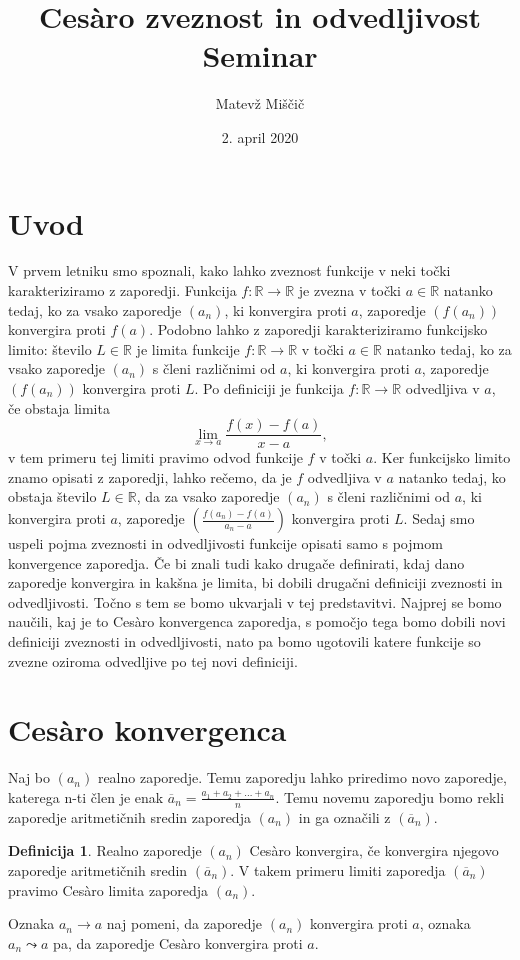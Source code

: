 \documentclass[a4paper,12pt]{article}
\title{Ces\`{a}ro zveznost in odvedljivost \\ Seminar}
\author{Matevž Miščič}
\date{2. april 2020}
\theoremstyle{definition}
\newtheorem{definicija}{Definicija}
\theoremstyle{plain}
\begin{document}
\maketitle{}

\section*{Uvod}
V prvem letniku smo spoznali, kako lahko zveznost funkcije v neki točki karakteriziramo z zaporedji. Funkcija $f: \mathbb{R} \rightarrow \mathbb{R}$ je zvezna v točki $a \in \mathbb{R}$ natanko tedaj, ko za vsako zaporedje $(a_n)$, ki konvergira proti $a$, zaporedje $(f(a_n))$ konvergira proti $f(a)$. Podobno lahko z zaporedji karakteriziramo funkcijsko limito: število $L \in \mathbb{R}$ je limita funkcije $f: \mathbb{R} \rightarrow \mathbb{R}$ v točki $a \in \mathbb{R}$ natanko tedaj, ko za vsako zaporedje $(a_n)$ s členi različnimi od $a$, ki konvergira proti $a$, zaporedje $(f(a_n))$ konvergira proti $L$. Po definiciji je funkcija $f: \mathbb{R} \rightarrow \mathbb{R}$ odvedljiva v $a$, če obstaja limita $$\lim_{x \rightarrow a} \frac{f(x)-f(a)}{x-a},$$ v tem primeru tej limiti pravimo odvod funkcije $f$ v točki $a$. Ker funkcijsko limito znamo opisati z zaporedji, lahko rečemo, da je $f$ odvedljiva v $a$ natanko tedaj, ko obstaja število $L \in \mathbb{R}$, da za vsako zaporedje $(a_n)$ s členi različnimi od $a$, ki konvergira proti $a$, zaporedje $(\frac{f(a_n)-f(a)}{a_n-a})$ konvergira proti $L$. Sedaj smo uspeli pojma zveznosti in odvedljivosti funkcije opisati samo s pojmom konvergence zaporedja. Če bi znali tudi kako drugače definirati, kdaj dano zaporedje konvergira in kakšna je limita, bi dobili drugačni definiciji zveznosti in odvedljivosti. Točno s tem se bomo ukvarjali v tej predstavitvi. Najprej se bomo naučili, kaj je to Ces\`{a}ro konvergenca zaporedja, s pomočjo tega bomo dobili novi definiciji zveznosti in odvedljivosti, nato pa bomo ugotovili katere funkcije so zvezne oziroma odvedljive po tej novi definiciji.



\section{Ces\`{a}ro konvergenca}
Naj bo $(a_n)$ realno zaporedje. Temu zaporedju lahko priredimo novo zaporedje, katerega n-ti člen je enak $\overline{a}_n = \frac{a_1+a_2+\ldots+a_n}{n}$. Temu novemu zaporedju bomo rekli zaporedje aritmetičnih sredin zaporedja $(a_n)$ in ga označili z $(\overline{a}_n)$.
\begin{definicija}
    Realno zaporedje $(a_n)$ Ces\`{a}ro konvergira, če konvergira njegovo zaporedje aritmetičnih sredin $(\overline{a}_n)$. V takem primeru limiti zaporedja $(\overline{a}_n)$ pravimo Ces\`{a}ro limita zaporedja $(a_n)$.
\end{definicija}
Oznaka $a_n \rightarrow a$ naj pomeni, da zaporedje $(a_n)$ konvergira proti $a$, oznaka $a_n \leadsto a$ pa, da zaporedje Ces\`{a}ro konvergira proti $a$. 
\end{document}
